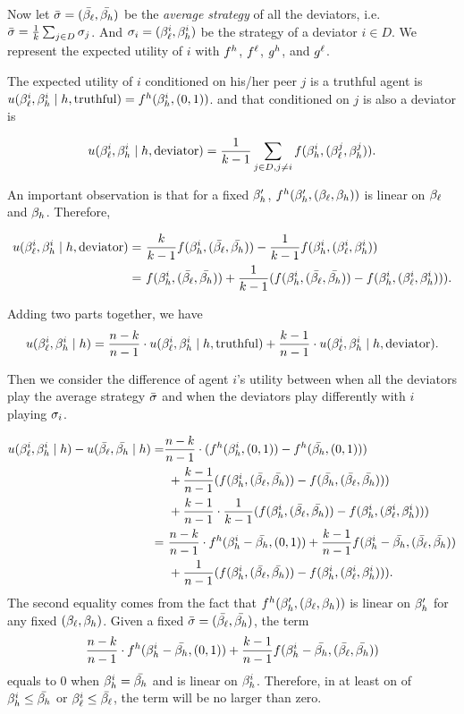 Now let $\bar{\sigma} = (\bar{\beta_{\ell}}, \bar{\beta_{h}})$ be the {\em average strategy} of all the deviators, i.e. $\bar{\sigma} = \frac{1}{k} \sum_{j\in D} \sigma_j$. And $\sigma_i = (\beta_{\ell}^i, \beta_{h}^i)$ be the strategy of a deviator $i\in D$. We represent the expected utility of $i$ with $f^h$, $f^\ell$, $g^h$, and $g^\ell$. 

The expected utility of $i$ conditioned on his/her peer $j$ is a truthful agent is $u(\beta_{\ell}^i, \beta_{h}^i \mid h, \text{truthful}) = f^h(\beta_{h}^i, (0, 1))$. and that conditioned on $j$ is also a deviator is 

\begin{align*}
    u(\beta_{\ell}^i, \beta_{h}^i \mid h, \text{deviator}) = \frac{1}{k - 1} \sum_{j \in D, j\neq i} f(\beta_{h}^i, (\beta_{\ell}^j, \beta_{h}^j)). 
\end{align*}

An important observation is that for a fixed $\beta_{h}'$, $f^h(\beta_{h}', (\beta_{\ell}, \beta_{h}))$ is linear on $\beta_{\ell}$ and $\beta_{h}$. Therefore, 

\begin{align*}
    u(\beta_{\ell}^i, \beta_{h}^i \mid h, \text{deviator}) =&\ \frac{k}{k - 1} f(\beta_{h}^i, (\bar{\beta_{\ell}}, \bar{\beta_{h}})) - \frac{1}{k-1} f(\beta_{h}^i, (\beta_{\ell}^i, \beta_{h}^i))\\
    =&\ f(\beta_{h}^i, (\bar{\beta_{\ell}}, \bar{\beta_{h}})) + \frac{1}{k-1} (f(\beta_{h}^i, (\bar{\beta_{\ell}}, \bar{\beta_{h}})) - f(\beta_{h}^i, (\beta_{\ell}^i, \beta_{h}^i))).
\end{align*}

Adding two parts together, we have
\begin{align*}
    u(\beta_{\ell}^i, \beta_{h}^i \mid h) = \frac{n-k}{n - 1} \cdot u(\beta_{\ell}^i, \beta_{h}^i \mid h, \text{truthful}) + \frac{k - 1}{n - 1} \cdot u(\beta_{\ell}^i, \beta_{h}^i \mid h, \text{deviator}).
\end{align*}

Then we consider the difference of agent $i$'s utility between when all the deviators play the average strategy $\bar{\sigma}$ and when the deviators play differently with $i$ playing $\sigma_i$. 

\begin{align*}
    u(\beta_{\ell}^i, \beta_{h}^i \mid h) - u(\bar{\beta_{\ell}}, \bar{\beta_{h}} \mid h) = &\frac{n-k}{n - 1} \cdot (f^h(\beta_{h}^i, (0, 1)) - f^h(\bar{\beta_{h}}, (0, 1))) \\
    &\ + \frac{k - 1}{n - 1} (f(\beta_{h}^i, (\bar{\beta_{\ell}}, \bar{\beta_{h}})) - f(\bar{\beta_{h}}, (\bar{\beta_{\ell}}, \bar{\beta_{h}})))\\
    &\ +\frac{k - 1}{n - 1} \cdot \frac{1}{k-1} (f(\beta_{h}^i, (\bar{\beta_{\ell}}, \bar{\beta_{h}})) - f(\beta_{h}^i, (\beta_{\ell}^i, \beta_{h}^i)))\\
    =&\ \frac{n-k}{n - 1} \cdot f^h(\beta_{h}^i - \bar{\beta_{h}}, (0, 1)) + \frac{k - 1}{n - 1} f(\beta_{h}^i - \bar{\beta_{h}}, (\bar{\beta_{\ell}}, \bar{\beta_{h}}))\\
    &\ +\frac{1}{n-1} (f(\beta_{h}^i, (\bar{\beta_{\ell}}, \bar{\beta_{h}})) - f(\beta_{h}^i, (\beta_{\ell}^i, \beta_{h}^i))).
\end{align*}
The second equality comes from the fact that $f^h(\beta_{h}', (\beta_{\ell}, \beta_{h}))$ is linear on $\beta_{h}'$ for any fixed $(\beta_{\ell}, \beta_{h})$. Given a fixed $\bar{\sigma} = (\bar{\beta_{\ell}}, \bar{\beta_{h}})$, the term
$$\frac{n-k}{n - 1} \cdot f^h(\beta_{h}^i - \bar{\beta_{h}}, (0, 1)) + \frac{k - 1}{n - 1} f(\beta_{h}^i - \bar{\beta_{h}}, (\bar{\beta_{\ell}}, \bar{\beta_{h}})) $$
equals to 0 when $\beta_{h}^i = \bar{\beta_{h}}$ and is linear on $\beta_{h}^i$. Therefore, in at least on of $\beta_{h}^i \le \bar{\beta_{h}}$ or $\beta_{\ell}^i \le \bar{\beta_{\ell}}$, the term will be no larger than zero. 

